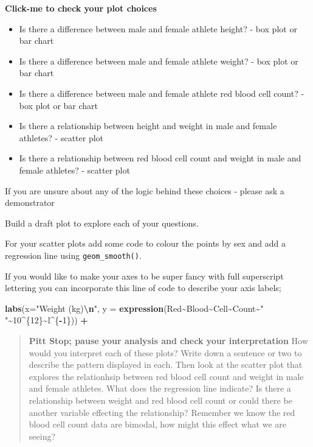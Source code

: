 \documentclass[
]{book}
\newenvironment{Shaded}{\begin{snugshade}}{\end{snugshade}}
\newcommand{\AttributeTok}[1]{\textcolor[rgb]{0.13,0.29,0.53}{#1}}
\newcommand{\DecValTok}[1]{\textcolor[rgb]{0.00,0.00,0.81}{#1}}
\newcommand{\FunctionTok}[1]{\textcolor[rgb]{0.13,0.29,0.53}{\textbf{#1}}}
\newcommand{\NormalTok}[1]{#1}
\newcommand{\SpecialCharTok}[1]{\textcolor[rgb]{0.81,0.36,0.00}{\textbf{#1}}}
\newcommand{\StringTok}[1]{\textcolor[rgb]{0.31,0.60,0.02}{#1}}
\providecommand{\tightlist}{%
  \setlength{\itemsep}{0pt}\setlength{\parskip}{0pt}}
\begin{document}
\textbf{Click-me to check your plot choices}

\begin{itemize}
\tightlist
\item
  Is there a difference between male and female athlete height? - box plot or bar chart
\item
  Is there a difference between male and female athlete weight? - box plot or bar chart
\item
  Is there a difference between male and female athlete red blood cell count? - box plot or bar chart
\item
  Is there a relationship between height and weight in male and female athletes? - scatter plot
\item
  Is there a relationship between red blood cell count and weight in male and female athletes? - scatter plot
\end{itemize}

If you are unsure about any of the logic behind these choices - please ask a demonstrator

Build a draft plot to explore each of your questions.

For your scatter plots add some code to colour the points by sex and add a regression line using \texttt{geom\_smooth()}.

If you would like to make your axes to be super fancy with full superscript lettering you can incorporate this line of code to describe your axis labels;

\begin{Shaded}
\begin{Highlighting}[]
\FunctionTok{labs}\NormalTok{(}\AttributeTok{x=}\StringTok{"Weight (kg)}\SpecialCharTok{\textbackslash{}n}\StringTok{"}\NormalTok{, }\AttributeTok{y =} \FunctionTok{expression}\NormalTok{(Red}\SpecialCharTok{\textasciitilde{}}\NormalTok{Blood}\SpecialCharTok{\textasciitilde{}}\NormalTok{Cell}\SpecialCharTok{\textasciitilde{}}\NormalTok{Count}\SpecialCharTok{\textasciitilde{}}\StringTok{" "}\SpecialCharTok{\textasciitilde{}}\DecValTok{10}\SpecialCharTok{\^{}}\NormalTok{\{}\DecValTok{12}\NormalTok{\}}\SpecialCharTok{\textasciitilde{}}\NormalTok{l}\SpecialCharTok{\^{}}\NormalTok{\{}\SpecialCharTok{{-}}\DecValTok{1}\NormalTok{\})) }\SpecialCharTok{+}
\end{Highlighting}
\end{Shaded}

\begin{quote}
\textbf{Pitt Stop; pause your analysis and check your interpretation}
How would you interpret each of these plots? Write down a sentence or two to describe the pattern displayed in each. Then look at the scatter plot that explores the relationhsip between red blood cell count and weight in male and female athletes. What does the regression line indicate? Is there a relationship between weight and red blood cell count or could there be another variable effecting the relationship? Remember we know the red blood cell count data are bimodal, how might this effect what we are seeing?
\end{quote}
\end{document}
